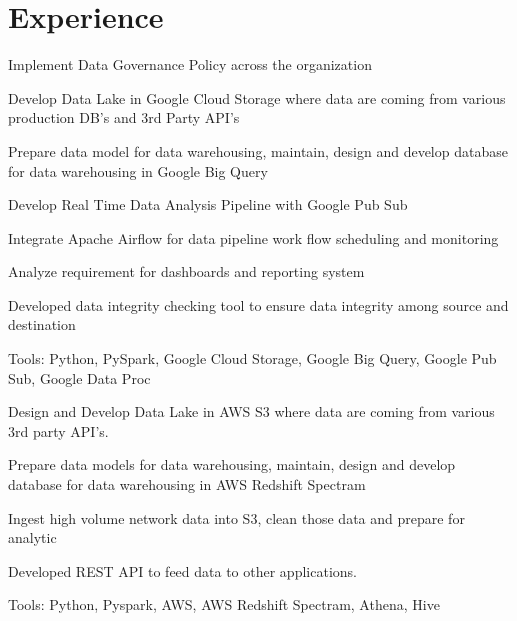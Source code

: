 \documentclass[letterpaper]{deedy-resume} %
\begin{document}
%
\begin{minipage}[t]{0.66\textwidth} %


\section{Experience}


\vspace{\topsep} %
\begin{tightitemize}
\item Implement Data Governance Policy across the organization
\item Develop Data Lake in Google Cloud Storage where data are coming from various production DB's and 3rd Party API's
\item Prepare data model for data warehousing, maintain, design and develop database for data warehousing in Google Big Query
\item Develop Real Time Data Analysis Pipeline with Google Pub Sub 
\item Integrate Apache Airflow for data pipeline work flow scheduling and monitoring
\item Analyze requirement for dashboards and reporting system
\item Developed data integrity checking tool to ensure data integrity among source and destination
\item Tools: Python, PySpark, Google Cloud Storage, Google Big Query, Google Pub Sub, Google Data Proc


\end{tightitemize}

\sectionspace %
\vspace{\topsep} %
\begin{tightitemize}
\item Design and Develop Data Lake in AWS S3 where data are coming from various 3rd party API's.
\item Prepare data models for data warehousing, maintain, design and develop database for data warehousing in AWS Redshift Spectram
\item Ingest high volume network data into S3, clean those data and prepare for analytic
\item Developed REST API to feed data to other applications.
\item Tools: Python, Pyspark, AWS, AWS Redshift Spectram, Athena, Hive
\end{tightitemize}


\end{minipage}
\end{document}

